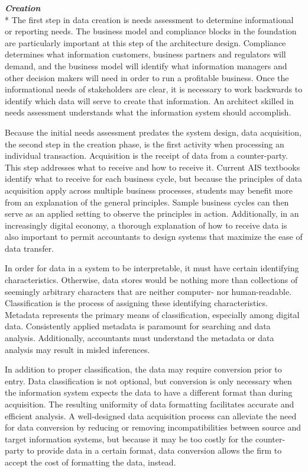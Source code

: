 \documentclass[12pt]{article}
\newcommand{\SubSubSection}[1]{{\centering{}\normalsize{}\textbf{\emph{#1}}}\\*\indent{}}
\begin{document}
\SubSubSection{Creation}
The first step in data creation is needs assessment to determine informational or reporting needs. The business model and compliance blocks in the foundation are particularly important at this step of the architecture design. Compliance determines what information customers, business partners and regulators will demand, and the business model will identify what information managers and other decision makers will need in order to run a profitable business. Once the informational needs of stakeholders are clear, it is necessary to work backwards to identify which data will serve to create that information. An architect skilled in needs assessment understands what the information system should accomplish.

Because the initial needs assessment predates the system design, data acquisition, the second step in the creation phase, is the first activity when processing an individual transaction. Acquisition is the receipt of data from a counter-party. This step addresses what to receive and how to receive it. Current AIS textbooks identify what to receive for each business cycle, but because the principles of data acquisition apply across multiple business processes, students may benefit more from an explanation of the general principles. Sample business cycles can then serve as an applied setting to observe the principles in action. Additionally, in an increasingly digital economy, a thorough explanation of how to receive data is also important to permit accountants to design systems that maximize the ease of data transfer.

In order for data in a system to be interpretable, it must have certain identifying characteristics. Otherwise, data stores would be nothing more than collections of seemingly arbitrary characters that are neither computer- nor human-readable. Classification is the process of assigning these identifying characteristics. Metadata represents the primary means of classification, especially among digital data. Consistently applied metadata is paramount for searching and data analysis. Additionally, accountants must understand the metadata or data analysis may result in misled inferences.

In addition to proper classification, the data may require conversion prior to entry. Data classification is not optional, but conversion is only necessary when the information system expects the data to have a different format than during acquisition. The resulting uniformity of data formatting facilitates accurate and efficient analysis. A well-designed data acquisition process can alleviate the need for data conversion by reducing or removing incompatibilities between source and target information systems, but because it may be too costly for the counter-party to provide data in a certain format, data conversion allows the firm to accept the cost of formatting the data, instead.
\end{document}
